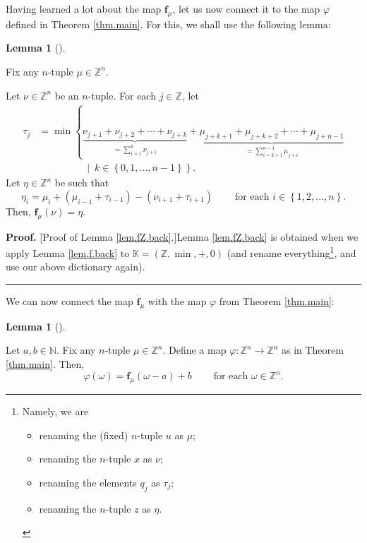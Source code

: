 \documentclass[numbers=enddot,12pt,final,onecolumn,notitlepage]{scrartcl}%
\theoremstyle{definition}
\newtheorem{lem}[theo]{Lemma}
\newenvironment{lemma}[1][]
{\begin{lem}[#1]\begin{leftbar}}
{\end{leftbar}\end{lem}}
\newenvironment{proof}[1][Proof]{\noindent\textbf{#1.} }{\ \rule{0.5em}{0.5em}}
\let\sumnonlimits\sum
\renewcommand{\sum}{\sumnonlimits\limits}
\begin{document}
Having learned a lot about the map $\mathbf{f}_{\mu}$, let us now connect it
to the map $\varphi$ defined in Theorem \ref{thm.main}. For this, we shall use
the following lemma:

\begin{lemma}
\label{lem.fZ.back}Fix any $n$-tuple $\mu\in\mathbb{Z}^{n}$.

Let $\nu\in\mathbb{Z}^{n}$ be an $n$-tuple. For each $j\in\mathbb{Z}$, let
\begin{align*}
\tau_{j}  &  =\min\left\{  \underbrace{\nu_{j+1}+\nu_{j+2}+\cdots+\nu_{j+k}%
}_{=\sum_{i=1}^{k}\nu_{j+i}}+\underbrace{\mu_{j+k+1}+\mu_{j+k+2}+\cdots
+\mu_{j+n-1}}_{=\sum_{i=k+1}^{n-1}\mu_{j+i}}\right. \\
&  \ \ \ \ \ \ \ \ \ \ \ \ \ \ \ \ \ \ \ \ \left.  \ \mid\ k\in\left\{
0,1,\ldots,n-1\right\}  \right\}  .
\end{align*}
Let $\eta\in\mathbb{Z}^{n}$ be such that%
\[
\eta_{i}=\mu_{i}+\left(  \mu_{i-1}+\tau_{i-1}\right)  -\left(  \nu_{i+1}%
+\tau_{i+1}\right)  \ \ \ \ \ \ \ \ \ \ \text{for each }i\in\left\{
1,2,\ldots,n\right\}  .
\]
Then, $\mathbf{f}_{\mu}\left(  \nu\right)  =\eta$.
\end{lemma}

\begin{proof}
[Proof of Lemma \ref{lem.fZ.back}.]Lemma \ref{lem.fZ.back} is obtained when we
apply Lemma \ref{lem.f.back} to \newline$\mathbb{K}=\left(  \mathbb{Z}%
,\min,+,0\right)  $ (and rename everything\footnote{Namely, we are
\par
\begin{itemize}
\item renaming the (fixed) $n$-tuple $u$ as $\mu$;
\par
\item renaming the $n$-tuple $x$ as $\nu$;
\par
\item renaming the elements $q_{j}$ as $\tau_{j}$;
\par
\item renaming the $n$-tuple $z$ as $\eta$.
\end{itemize}
\par
{}}, and use our above dictionary again).
\end{proof}

We can now connect the map $\mathbf{f}_{\mu}$ with the map $\varphi$ from
Theorem \ref{thm.main}:

\begin{lemma}
\label{lem.fZ.phi}Let $a,b\in\mathbb{N}$. Fix any $n$-tuple $\mu\in
\mathbb{Z}^{n}$. Define a map $\varphi:\mathbb{Z}^{n}\rightarrow\mathbb{Z}%
^{n}$ as in Theorem \ref{thm.main}. Then,%
\[
\varphi\left(  \omega\right)  =\mathbf{f}_{\mu}\left(  \omega-a\right)
+b\ \ \ \ \ \ \ \ \ \ \text{for each }\omega\in\mathbb{Z}^{n}.
\]

\end{lemma}
\end{document}
